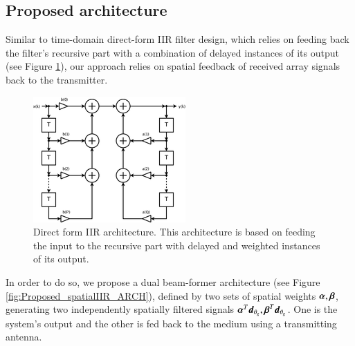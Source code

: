 \subsection*{Proposed architecture}
Similar to time-domain direct-form IIR filter design, which relies on feeding back the filter's recursive part with a combination of delayed instances of its output (see Figure \ref{fig:IIR_feedbachArch}), our approach relies on spatial feedback of received array signals back to the transmitter.
\begin{figure}[!h]
\begin{center}
\includegraphics[width=0.5\linewidth]{./Media/BASIC_IIR_FILTER_ARCH.png}
\caption{Direct form IIR architecture. This architecture is based on feeding the input to the recursive part with delayed and weighted instances of its output.}
\label{fig:IIR_feedbachArch}
\end{center}
\end{figure}
In order to do so, we propose a dual beam-former architecture (see Figure \ref{fig:Proposed_spatialIIR_ARCH}), defined by two sets of spatial weights $\boldsymbol{\alpha},\boldsymbol{\beta}$, generating two independently spatially filtered signals $\boldsymbol{\alpha}^{T}\boldsymbol{d}_{\theta_{g}},\boldsymbol{\beta}^{T}\boldsymbol{d}_{\theta_{g}}$. One is the system's output and the other is fed back to the medium using a transmitting antenna.
